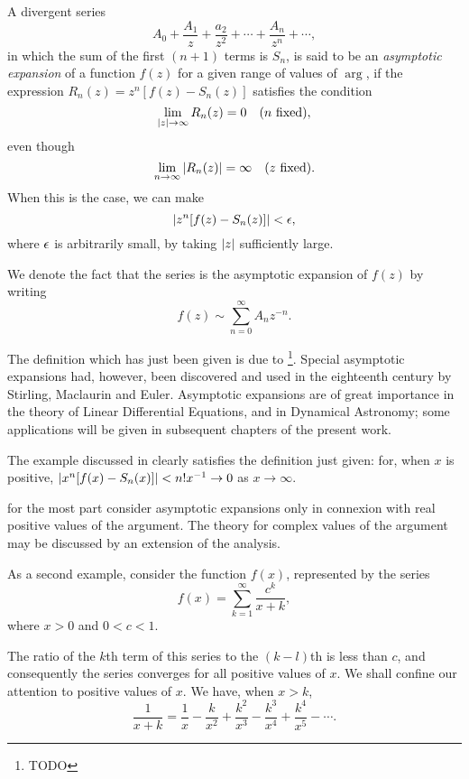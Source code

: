  A divergent series
$$
A_{0} + \frac{A_{1}}{z} + \frac{a_{2}}{z^{2}} + \cdots +
\frac{A_{n}}{z^{n}} + \cdots,
$$
in which the sum of the first $(n + 1)$ terms is $S_{n}$, is said to
be an \emph{asymptotic expansion} of a function $f(z)$ for a given
range of values of $\arg$, if the expression $R_{n}(z) = z^{n}[f(z) -
S_{n}(z)]$ satisfies the condition
$$
\lim_{ \left| z \right| \rightarrow \infty } R_{n}(z) = 0 \quad (\textrm{$n$
fixed}),
$$
even though
$$
\lim_{n \rightarrow \infty} \left| R_{n}(z) \right| = \infty \quad
(\textrm{$z$ fixed}).
$$
When this is the case, we can make
$$
\left|  z^{n} [f(z) - S_{n}(z)]  \right| < \epsilon,
$$
where $\epsilon$ is arbitrarily small, by taking $\left| z \right|$ sufficiently
large.

We denote the fact that the series is the asymptotic expansion of
$f(z)$ by writing
$$
f(z) \sim \sum_{n=0}^{\infty} A_{n} z^{-n}.
$$

The definition which has just been given is due to
\Poincare\footnote{TODO}. Special asymptotic expansions had, however,
been discovered and used in the eighteenth century by Stirling,
Maclaurin and Euler. Asymptotic expansions are of great importance in
the theory of Linear Differential Equations, and in Dynamical
Astronomy; some applications will be given in subsequent chapters of
the present work.

The example discussed in  clearly satisfies the
definition just given: for, when $x$ is positive, $\left| x^{n} [f(x)
- S_{n}(x)] \right| < n! x^{-1} \rightarrow 0$ as $x \rightarrow \infty$.

for the most part consider asymptotic expansions only in connexion
with real positive values of the argument. The theory for complex
values of the argument may be discussed by an extension of the
analysis.

 As a second
example, consider the function $f(x)$, represented by the series
$$
f(x) = \sum_{k=1}^{\infty} \frac{c^{k}}{x+k},
$$
where $x > 0$ and $0 < c < 1$.

%
%

The ratio of the $k$th term of this series to the $(k- l)$th is less
than $c$, and consequently the series converges for all positive
values of $x$. We shall confine our attention to positive values of
$x$. We have, when $x > k$,
$$
\frac{1}{x+k} = \frac{1}{x} - \frac{k}{x^{2}} + \frac{k^{2}}{x^{3}} -
\frac{k^{3}}{x^{4}} + \frac{k^{4}}{x^{5}} - \cdots.
$$

